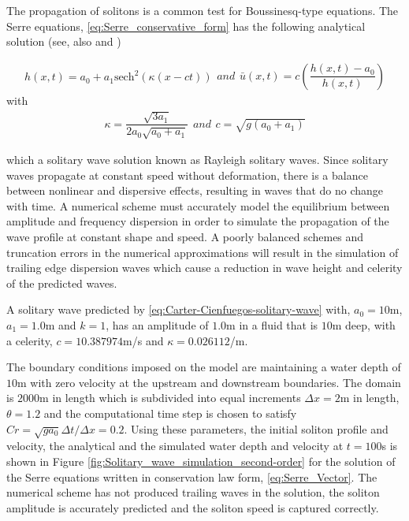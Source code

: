 \documentclass[SingleSpace,12pt]{Serre_ASCE}
\begin{document}
The propagation of solitons is a common test for Boussinesq-type equations. The Serre equations, \eqref{eq:Serre_conservative_form} has the following analytical  solution \cite{El-etal-2006}(see, also  and )
\begin{linenomath*}
\begin{subequations}\label{eq:Carter-Cienfuegos-solitary-wave}
\label{eq:Carter-9}
\begin{gather}
h(x,t) = a_0 + a_1 \text{sech}^2(\kappa(x - ct))
\end{gather}
and
\begin{gather}
\bar{u}(x,t) = c \left ( \dfrac{h(x,t) - a_0}{h(x,t)} \right )
\end{gather}
\end{subequations}
with
\begin{subequations}
\begin{gather*}
\kappa = \dfrac{\sqrt{3a_1}}{2a_0\sqrt{a_0 + a_1}}
\end{gather*}
and
\begin{gather*}
c = \sqrt{g(a_0 + a_1)}
\end{gather*}
\end{subequations}
\end{linenomath*}
which a solitary wave solution known as Rayleigh solitary waves. Since solitary waves propagate at constant speed without deformation, there is a balance between nonlinear and dispersive effects, resulting in waves that do no change with time.   A numerical scheme must accurately model the equilibrium between amplitude and frequency dispersion in order to simulate the  propagation of the wave profile at constant shape and speed. A poorly balanced schemes and truncation errors in the numerical approximations will result in the simulation of trailing edge dispersion waves which cause a reduction in wave height and celerity of the predicted waves.

A solitary wave predicted by \eqref{eq:Carter-Cienfuegos-solitary-wave} with, $a_0 = 10$m, $a_1 = 1.0$m and $k = 1$, has an amplitude of $1.0$m in a fluid that is $10$m deep, with a celerity, $c = 10.387974$m/s and $\kappa = 0.026112$/m.

The boundary conditions imposed on the model are maintaining a water depth of $10$m with zero velocity at the upstream and downstream boundaries. The domain is $2000$m in length which is subdivided into equal increments $\Delta x = 2$m in length, $\theta = 1.2$ and the computational time step is chosen to satisfy $Cr = \sqrt{g a_0}\Delta t/\Delta x = 0.2$. Using these parameters, the initial soliton profile and velocity, the analytical and the simulated water depth and velocity at $t = 100$s is shown in Figure \ref{fig:Solitary_wave_simulation_second-order} for the solution of the Serre equations written in conservation law form, \eqref{eq:Serre_Vector}. The numerical scheme has not produced trailing waves in the solution, the soliton amplitude is accurately predicted and the soliton speed is captured correctly.
\end{document}
